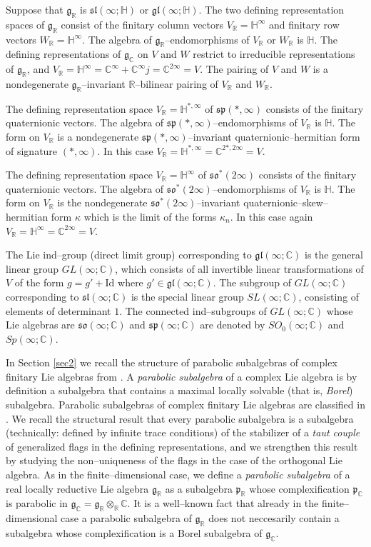 \documentclass[oneside,leqno,11pt]{article}
\def\gg{\mathfrak{g}}
\def\ggl{\mathfrak{gl}}
\def\gp{\mathfrak{p}}
\def\gsl{\mathfrak{sl}}
\def\gso{\mathfrak{so}}
\def\gsp{\mathfrak{sp}}
\def\C{\mathbb{C}}
\def\H{\mathbb{H}}
\def\R{\mathbb{R}}
\begin{document}
Suppose that $\gg_\R$ is $\gsl(\infty;\H)$ or $\ggl(\infty;\H)$.  The two defining 
representation spaces of $\gg_\R$ consist of the finitary column vectors $V_\R = \H^\infty$ and finitary row vectors $W_\R = \H^\infty$.  The algebra of $\gg_\R$--endomorphisms of $V_\R$ or $W_\R$ is $\H$.  
The defining representations of $\gg_\C$ on $V$ and $W$ restrict to 
irreducible representations of $\gg_\R$, and $V_\R = \H^\infty = \C^\infty + \C^\infty j  = \C^{2\infty} = V$.  The pairing of $V$ and $W$ is a nondegenerate $\gg_\R$--invariant $\R$--bilinear pairing of $V_\R$ and $W_\R$.  

The defining representation space $V_\R = \H^{*,\infty}$ of $\gsp(*,\infty)$ 
consists of the finitary quaternionic vectors.  The algebra of $\gsp(*,\infty)$--endomorphisms of $V_\R$ is $\H$.  The form on $V_\R$ is a nondegenerate $\gsp(*,\infty)$--invariant quaternionic--hermitian form of signature $(*,\infty)$.  In this case $V_\R = \H^{*,\infty} = \C^{2*,2\infty} = V$.

The defining representation space $V_\R = \H^\infty$ of $\gso^*(2\infty)$ 
consists of the finitary quaternionic vectors.  The algebra of 
$\gso^*(2\infty)$--endomorphisms of $V_\R$ is $\H$.  The form on $V_\R$ is the nondegenerate $\gso^*(2\infty)$--invariant quaternionic--skew--hermitian form $\kappa$ which is the limit of the forms $\kappa_n$.   In this case again $V_\R =  \H^\infty = \C^{2\infty} = V$. 

The Lie ind--group (direct limit group) corresponding to $\ggl(\infty;\C)$ is the general linear group $GL(\infty;\C)$, which consists of all invertible linear transformations of $V$ of the form $g = g' + \mathrm{Id}$ where $g' \in \ggl(\infty;\C)$.  The subgroup of $GL(\infty;\C)$ corresponding to $\gsl(\infty;\C)$ is the special linear group $SL(\infty;\C)$, consisting of elements of determinant $1$.  The connected ind--subgroups of $GL(\infty;\C)$ whose Lie algebras are $\gso(\infty;\C)$ and $\gsp(\infty;\C)$ are denoted by $SO_0(\infty;\C)$ and $Sp(\infty;\C)$.

In Section \ref{sec2} we recall the structure of parabolic subalgebras of complex finitary Lie algebras from \cite{DC2}.  A \emph{parabolic subalgebra} of a complex Lie algebra is by definition a subalgebra that contains a maximal locally solvable (that is, \emph{Borel}) subalgebra.  
Parabolic subalgebras of complex finitary Lie algebras are classified in \cite{DC2}.  
We recall the structural result that every parabolic subalgebra is a subalgebra (technically: defined by infinite trace conditions) of the stabilizer of a 
\emph{taut couple} of generalized flags in the defining representations, and we strengthen this result by studying the non--uniqueness of the flags in the case of the orthogonal Lie algebra.  As in the finite--dimensional case, we define a \emph{parabolic subalgebra} of a real locally reductive Lie algebra $\gg_\R$ as a subalgebra $\gp_\R$ whose complexification $\gp_\C$ is parabolic in $\gg_\C = \gg_\R \otimes_\R \C$.  It is a well--known fact that already in the finite--dimensional case a parabolic subalgebra of $\gg_\R$ does not neccesarily contain a subalgebra whose complexification is a Borel subalgebra of $\gg_\C$.  
\end{document}
